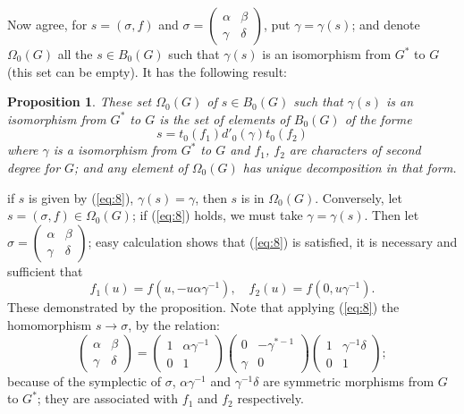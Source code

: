 \documentclass[12pt]{amsart}
\newtheorem{prop}{Proposition}
\newcounter{ssection}
\renewcommand{\subsection}{
  \addtocounter{ssection}{1}{\bf  \arabic{ssection}.\  }}
\begin{document}
\subsection{}
Now agree, for $s=(\sigma, f)$ and 
$\sigma=\begin{pmatrix}\alpha &\beta \\ \gamma &\delta
\end{pmatrix}$, 
put $\gamma = \gamma(s)$; and denote $\Omega_0(G)$  all the $s\in B_0(G)$
such that $\gamma(s)$ is an isomorphism from $G^*$ to $G$
(this set can be empty).
It has the following result:
\begin{prop}\label{p:1}
These set $\Omega_0(G)$ of $s\in B_0(G)$ such that $\gamma(s)$ is an 
isomorphism from $G^*$ to $G$ is the set of elements of $B_0(G)$  of the forme 
\begin{equation}\label{eq:8}
s = t_0(f_1)d'_0(\gamma)t_0(f_2)
\end{equation}
where $\gamma$ is a isomorphism from $G^*$ to $G$ and $f_1$, $f_2$ are 
characters of second degree for $G$;
and any element of $\Omega_0(G)$ has unique decomposition in that form.  
\end{prop}
if $s$ is given by (\ref{eq:8}), $\gamma(s)=\gamma$, then 
$s$ is in $\Omega_0(G)$.
Conversely, let $s =(\sigma, f) \in  \Omega_0(G)$; if (\ref{eq:8}) holds, 
we must take $\gamma=\gamma(s)$. Then let 
$\sigma=\begin{pmatrix}\alpha &\beta \\ \gamma &\delta \end{pmatrix}$; easy 
calculation shows that (\ref{eq:8}) is satisfied, 
it is necessary and sufficient that 
\[
f_1(u)=f(u,-u\alpha\gamma^{-1}), \quad f_2(u)=f(0,u\gamma^{-1}).
\]
These demonstrated by  the proposition. 
Note that applying (\ref{eq:8}) the homomorphism
$s\to \sigma$, by the relation:
\[
\begin{pmatrix}\alpha &\beta \\ \gamma &\delta \end{pmatrix}
= \begin{pmatrix}
1 & \alpha\gamma^{-1}\\
0 & 1
\end{pmatrix}
\begin{pmatrix}
0 & -\gamma^{*-1}\\
\gamma & 0
\end{pmatrix}
\begin{pmatrix}
1 & \gamma^{-1}\delta\\
0 & 1
\end{pmatrix};
\]
because of the symplectic of $\sigma$, $\alpha\gamma^{-1}$ and $\gamma^{-1}\delta$
are symmetric morphisms from $G$ to $G^*$; they are associated with
 $f_1$ and $f_2$ respectively.
\end{document}
